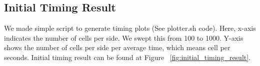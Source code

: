 \subsection{Initial Timing Result}
We made simple script to generate timing plots (See plotter.sh code). Here, x-axis indicates the number of cells per side. We swept this from 100 to 1000. Y-axis shows the number of cells per side per average time, which means cell per seconds. Initial timing result can be found at Figure ~\ref{fig:initial_timing_result}.

